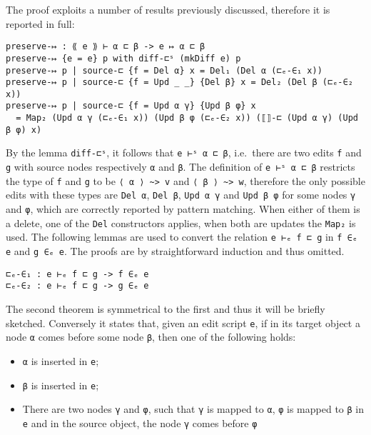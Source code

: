 \documentclass[../Thesis.tex]{subfiles}
\begin{document}
	The proof exploits a number of results previously discussed,
	therefore it is reported in full:

\begin{verbatim}
preserve-↦ : ⟪ e ⟫ ⊢ α ⊏ β -> e ↦ α ⊏ β
preserve-↦ {e = e} p with diff-⊏ˢ (mkDiff e) p
preserve-↦ p | source-⊏ {f = Del α} x = Del₁ (Del α (⊏ₑ-∈₁ x))
preserve-↦ p | source-⊏ {f = Upd _ _} {Del β} x = Del₂ (Del β (⊏ₑ-∈₂ x))
preserve-↦ p | source-⊏ {f = Upd α γ} {Upd β φ} x 
  = Map₂ (Upd α γ (⊏ₑ-∈₁ x)) (Upd β φ (⊏ₑ-∈₂ x)) (⟦⟧-⊏ (Upd α γ) (Upd β φ) x)
\end{verbatim}

	By the lemma \texttt{diff-⊏ˢ}, it follows that \texttt{e ⊢ˢ α ⊏ β},
	i.e.\ there are two edits \texttt{f} and \texttt{g} with source nodes 
	respectively \texttt{α} and \texttt{β}.
	The definition of \texttt{e ⊢ˢ α ⊏ β} restricts the type of 
	\texttt{f} and \texttt{g} to be \texttt{⟨ α ⟩ \textasciitilde> v} and \texttt{⟨ β ⟩ \textasciitilde> w}, 
	therefore the only possible edits with these types are \texttt{Del α},
	\texttt{Del β}, \texttt{Upd α γ} and \texttt{Upd β φ} for some
	nodes \texttt{γ} and \texttt{φ}, which are
	correctly reported by pattern matching.
	When either of them is a delete, one of the \texttt{Del} constructors applies,
	when both are updates the \texttt{Map₂} is used.
	The following lemmas are used to convert the relation \texttt{e ⊢ₑ f ⊏ g}
	in \texttt{f ∈ₑ e} and \texttt{g ∈ₑ e}.
	The proofs are by straightforward induction and thus omitted.
	
\begin{verbatim}
⊏ₑ-∈₁ : e ⊢ₑ f ⊏ g -> f ∈ₑ e
⊏ₑ-∈₂ : e ⊢ₑ f ⊏ g -> g ∈ₑ e
\end{verbatim}

	The second theorem is symmetrical to the first and thus it will be briefly 
	sketched.
	Conversely it states that, given an edit script \texttt{e}, if in its
	target object a node \texttt{α} comes before
	some node \texttt{β}, then one of the following holds:
	\begin{itemize}
		\item \texttt{α} is inserted in \texttt{e};
		\item \texttt{β} is inserted in \texttt{e};
		\item There are two nodes \texttt{γ} and \texttt{φ}, such that \texttt{γ} is 
		mapped to \texttt{α}, \texttt{φ} is mapped to \texttt{β} in \texttt{e} and 
		in the source object, the node \texttt{γ} comes before \texttt{φ}
	\end{itemize}
\end{document}
